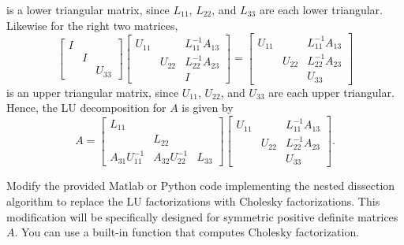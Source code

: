 \documentclass{../kin_math}
\begin{document}
\begin{questions}
\begin{enumerate}
\begin{solution}
\begin{equation*}
      \end{equation*}
      is a lower triangular matrix, since $L_{11}$, $L_{22}$, and $L_{33}$ are each lower triangular. Likewise for the right two matrices,
      \begin{equation*}
        \begin{bmatrix} I & & \\ & I & \\ & & U_{33} \end{bmatrix} \begin{bmatrix} U_{11} & & L_{11}^{-1} A_{13} \\ & U_{22} & L_{22}^{-1} A_{23} \\ & & I \end{bmatrix} = \begin{bmatrix} U_{11} & & L_{11}^{-1} A_{13} \\ & U_{22} & L_{22}^{-1} A_{23} \\ & & U_{33} \end{bmatrix}
      \end{equation*}
      is an upper triangular matrix, since $U_{11}$, $U_{22}$, and $U_{33}$ are each upper triangular. Hence, the LU decomposition for $A$ is given by
      \begin{equation*}
        A = \begin{bmatrix} L_{11} & & \\ & L_{22} & \\ A_{31} U_{11}^{-1} & A_{32} U_{22}^{-1} & L_{33} \end{bmatrix} \begin{bmatrix} U_{11} & & L_{11}^{-1} A_{13} \\ & U_{22} & L_{22}^{-1} A_{23} \\ & & U_{33} \end{bmatrix}.
      \end{equation*}
    \end{solution}
  \end{enumerate}

  \question Modify the provided Matlab or Python code implementing the nested dissection algorithm to replace the LU factorizations with Cholesky factorizations. This modification will be specifically designed for symmetric positive definite matrices $A$. You can use a built-in function that computes Cholesky factorization.


\end{questions}
\end{document}
